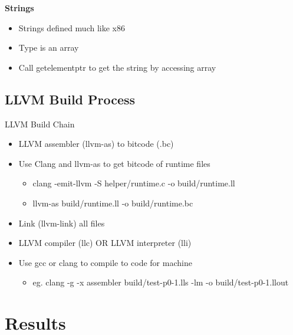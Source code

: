 \documentclass{beamer}
\begin{document}
\begin{frame}[shrink]{\bf Strings}
  \begin{itemize}
  \item<1->Strings defined much like x86
  \item<2->Type is an array
  \item<3->Call getelementptr to get the string by accessing array
  \end{itemize}
  \pause
  
\end{frame}

\subsection{LLVM Build Process}

\begin{frame}{LLVM Build Chain}
\begin{itemize}
  \item<1->LLVM assembler (llvm-as) to bitcode (.bc)
  \item<2->Use Clang and llvm-as to get bitcode of runtime files
  \begin{itemize}
    \item<2->clang -emit-llvm -S helper/runtime.c -o build/runtime.ll
    \item<2->llvm-as  build/runtime.ll -o build/runtime.bc
  \end{itemize}
  \item<3->Link (llvm-link) all files
  \item<4->LLVM compiler (llc) OR LLVM interpreter (lli)
  \item<5->Use gcc or clang to compile to code for machine 
  \begin{itemize}
    \item<5->eg. clang -g -x assembler build/test-p0-1.lls -lm -o build/test-p0-1.llout
  \end{itemize}
  \end{itemize}
\end{frame}

\section{Results}
\end{document}
